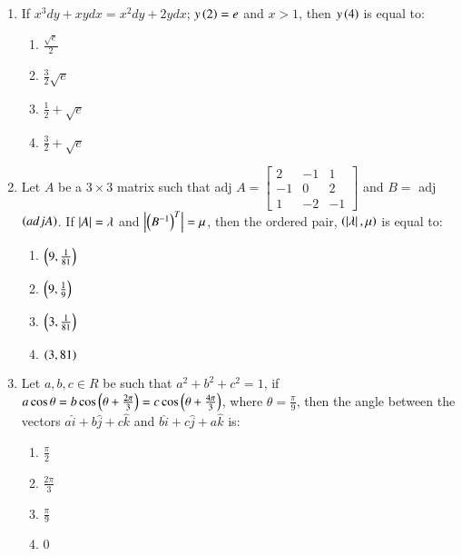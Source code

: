 \documentclass[journal,9pt,twocolumn]{IEEEtran}
\begin{document}
\begin{enumerate}
    \item  If $x^3dy + xydx = x^2dy + 2ydx$; $y\left(2\right) = e$ and $x > 1$, then $y\left(4\right)$ is equal to:
        
        \begin{multicols}{4}
\begin{enumerate}
    \item $\frac{\sqrt{e}}{2}$
    \item $\frac{3}{2} \sqrt{e}$
    \item $\frac{1}{2} + \sqrt{e}$
    \item $\frac{3}{2} + \sqrt{e}$
\end{enumerate}
\end{multicols}

\item Let $A$ be a $3 \times 3$ matrix such that adj $A = \begin{bmatrix}
2 &-1& 1\\-1& 0& 2\\1& -2& -1
\end{bmatrix} $
and $B =$ adj$\left(adj  A\right)$. If $\left\vert A\right\vert = \lambda$ and $\left\vert\left(B^{-1}\right)^T\right\vert = \mu$, then the ordered pair, $\left(\left\vert\lambda\right\vert, \mu\right)$ is equal to:

        \begin{multicols}{2}

\begin{enumerate}
    \item $\left(9, \frac{1}{81}\right)$
    \item $\left(9, \frac{1}{9}\right)$
    \item $\left(3, \frac{1}{81}\right)$
    \item $\left(3, 81\right)$
\end{enumerate}
\end{multicols}

\item Let $a, b, c \in R$ be such that $a^2 + b^2 + c^2 = 1$, if $a \cos \theta = b \cos\left(\theta + \frac{2\pi}{3}\right) = c \cos\left(\theta + \frac{4\pi}{3}\right)$, where $\theta = \frac{\pi}{9}$, then the angle between the vectors $a\hat{i} + b\hat{j} + c\hat{k}$ and $b\hat{i} + c\hat{j}+ a\hat{k} $ is:
        \begin{multicols}{4}

\begin{enumerate}
    \item $\frac{\pi}{2}$
    \item $\frac{2\pi}{3}$
    \item $\frac{\pi}{9}$
    \item $0$
\end{enumerate}
\end{multicols}


\end{enumerate}
\end{document}
